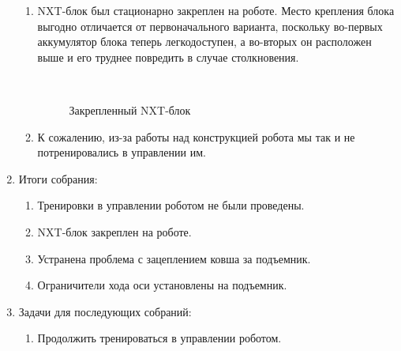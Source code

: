 \begin{enumerate}
\begin{enumerate}
      \item NXT-блок был стационарно закреплен на роботе. Место крепления блока выгодно отличается от первоначального варианта, поскольку во-первых аккумулятор блока теперь легкодоступен, а во-вторых он расположен выше и его труднее повредить в случае столкновения.
      
      \begin{figure}[H]
      	\begin{minipage}[h]{0.2\linewidth}
      		\center  
      	\end{minipage}
      	\begin{minipage}[h]{0.6\linewidth}
      		\caption{Закрепленный NXT-блок}
      	\end{minipage}
      \end{figure}
      
      \item К сожалению, из-за работы над конструкцией робота мы так и не потренировались в управлении им.
          
    \end{enumerate}
    
	\item Итоги собрания: 
	\begin{enumerate}
	  \item Тренировки в управлении роботом не были проведены.
	  	
	  \item NXT-блок закреплен на роботе.
	  
      \item Устранена проблема с зацеплением ковша за подъемник.
      
      \item Ограничители хода оси установлены на подъемник.
      
    \end{enumerate}
    
	\item Задачи для последующих собраний:
	\begin{enumerate}
	  \item Продолжить тренироваться в управлении роботом.
	  
    \end{enumerate}     
\end{enumerate}
\fillpage